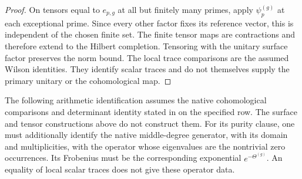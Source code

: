 \begin{proof}
On tensors equal to \(e_{p,g}\) at all but finitely many primes,
apply \(\psi_p^{(g)}\) at each exceptional prime. Since every other
factor fixes its reference vector, this is independent of the chosen
finite set. The finite tensor maps are contractions and therefore
extend to the Hilbert completion. Tensoring with the unitary surface
factor preserves the norm bound. The local trace comparisons are
the assumed Wilson identities. They identify scalar traces and do
not themselves supply the primary unitary or the cohomological map.
\end{proof}
The following arithmetic identification assumes the native
cohomological comparisons and determinant identity stated in
 on the specified row.
The surface and tensor constructions above do not construct them.
For its purity clause, one must additionally identify the native
middle-degree generator, with its domain and multiplicities, with
the operator whose eigenvalues are the nontrivial zero occurrences.
Its Frobenius must be the corresponding exponential $e^{-\Theta^{(g)}}$.
An equality of local scalar traces does not give these operator data.


